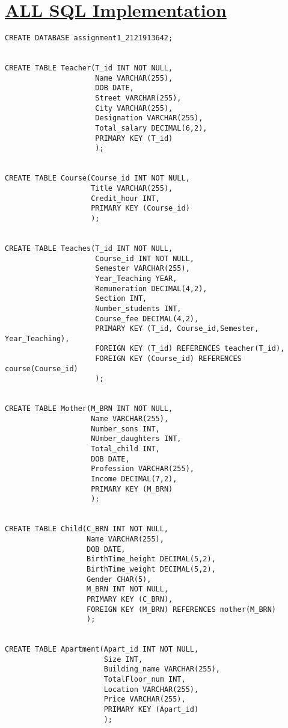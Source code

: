 \documentclass[a4paper, 12pt]{article}
\author{}
\date{}
\begin{document}
\newpage
\section{\textbf{\uline{ALL SQL Implementation}}}

\begin{verbatim}
CREATE DATABASE assignment1_2121913642;


CREATE TABLE Teacher(T_id INT NOT NULL,
                     Name VARCHAR(255),
                     DOB DATE,
                     Street VARCHAR(255),
                     City VARCHAR(255),
                     Designation VARCHAR(255),
                     Total_salary DECIMAL(6,2),
                     PRIMARY KEY (T_id)
                     );


CREATE TABLE Course(Course_id INT NOT NULL,
                    Title VARCHAR(255),
                    Credit_hour INT,
                    PRIMARY KEY (Course_id)
                    );


CREATE TABLE Teaches(T_id INT NOT NULL,
                     Course_id INT NOT NULL,
                     Semester VARCHAR(255),
                     Year_Teaching YEAR,
                     Remuneration DECIMAL(4,2),
                     Section INT,
                     Number_students INT,
                     Course_fee DECIMAL(4,2),
                     PRIMARY KEY (T_id, Course_id,Semester, Year_Teaching),
                     FOREIGN KEY (T_id) REFERENCES teacher(T_id),
                     FOREIGN KEY (Course_id) REFERENCES course(Course_id)
                     );


CREATE TABLE Mother(M_BRN INT NOT NULL,
                    Name VARCHAR(255),
                    Number_sons INT,
                    NUmber_daughters INT,
                    Total_child INT,
                    DOB DATE,
                    Profession VARCHAR(255),
                    Income DECIMAL(7,2),
                    PRIMARY KEY (M_BRN)
                    );


CREATE TABLE Child(C_BRN INT NOT NULL,
                   Name VARCHAR(255),
                   DOB DATE,
                   BirthTime_height DECIMAL(5,2),
                   BirthTime_weight DECIMAL(5,2),
                   Gender CHAR(5),
                   M_BRN INT NOT NULL,
                   PRIMARY KEY (C_BRN),
                   FOREIGN KEY (M_BRN) REFERENCES mother(M_BRN)
                   );


CREATE TABLE Apartment(Apart_id INT NOT NULL,
                       Size INT,
                       Building_name VARCHAR(255),
                       TotalFloor_num INT,
                       Location VARCHAR(255),
                       Price VARCHAR(255),
                       PRIMARY KEY (Apart_id)
                       );



\end{verbatim}
\end{document}
